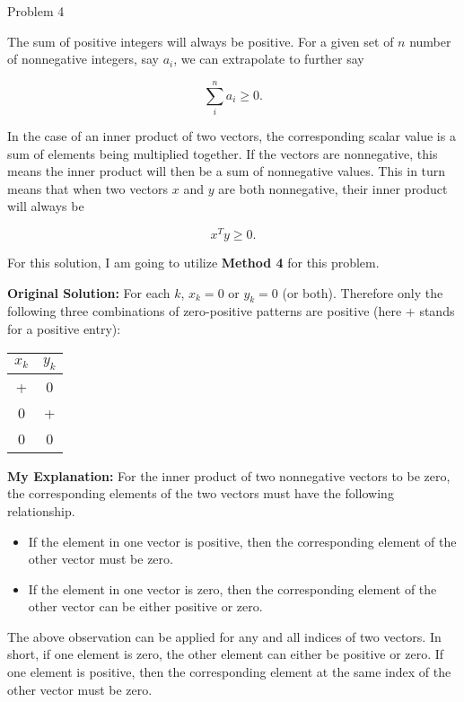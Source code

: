 \begin{problem}{Problem 4}
\begin{highlight}
        The sum of positive integers will always be positive. For a given set of $n$ number of nonnegative integers, say $a_i$, we can extrapolate to further say

        \begin{equation}
            \sum^{n}_{i} a_{i} \geq 0.
        \end{equation}

        In the case of an inner product of two vectors, the corresponding scalar value is a sum of elements being multiplied together. If the vectors are nonnegative, this means the inner product will
        then be a sum of nonnegative values. This in turn means that when two vectors $x$ and $y$ are both nonnegative, their inner product will always be

        \begin{equation}
            x^{T}y \geq 0.
        \end{equation}
    \end{highlight}

    \begin{highlight}
        For this solution, I am going to utilize \textbf{Method 4} for this problem. \vspace*{1em}

        \textbf{Original Solution:} For each $k$, $x_k = 0$ or $y_k = 0$ (or both). Therefore only the following three combinations of zero-positive patterns are positive (here + stands for a positive entry):

        \newpage
        \begin{center}
            \begin{tabular}[]{c c}
                $x_{k}$ & $y_{k}$ \\ \hline
                + & 0 \\
                0 & + \\
                0 & 0 \\
            \end{tabular}
        \end{center}
        \textbf{My Explanation:} For the inner product of two nonnegative vectors to be zero, the corresponding elements of the two vectors must have the following relationship.
        \begin{itemize}
            \item If the element in one vector is positive, then the corresponding element of the other vector must be zero.
            \item If the element in one vector is zero, then the corresponding element of the other vector can be either positive or zero.
        \end{itemize}

        The above observation can be applied for any and all indices of two vectors. In short, if one element is zero, the other element can either be positive or zero. If one element is positive, then the corresponding
        element at the same index of the other vector must be zero.
    \end{highlight}
\end{problem}

